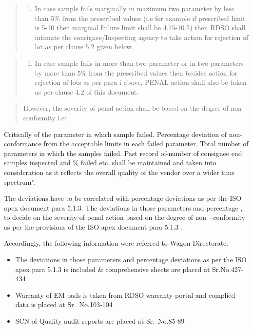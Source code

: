 \documentclass[nofonts,]{tufte-book}
\providecommand{\tightlist}{%
  \setlength{\itemsep}{0pt}\setlength{\parskip}{0pt}}
\begin{document}
\begin{quote}
\begin{enumerate}
\def\labelenumi{(\roman{enumi})}
\tightlist
\item
  In case sample fails marginally in maximum two parameter by less than
  5\% from the prescribed values (i.e for example if prescribed limit is
  5-10 then marginal failure limit shall be 4.75-10.5) then RDSO shall
  intimate the consignee/Inspecting agency to take action for rejection
  of lot as per clause 5.2 given below.
\end{enumerate}
\end{quote}

\begin{quote}
\begin{enumerate}
\def\labelenumi{(\roman{enumi})}
\setcounter{enumi}{1}
\tightlist
\item
  In case sample fails in more than two parameter or in two parameters
  by more than 5\% from the prescribed values then besides action for
  rejection of lots as per para i above, PENAL action shall also be
  taken as per clause 4.2 of this document.
\end{enumerate}
\end{quote}

\begin{quote}
However, the severity of penal action shall be based on the degree of
non-conformity i.e:
\end{quote}

Critically of the parameter in which sample failed. Percentage deviation
of non-conformance from the acceptable limits in each failed parameter.
Total number of parameters in which the samples failed. Past record
of-number of consignee end samples inspected and \% failed etc. shall be
maintained and taken into consideration as it reflects the overall
quality of the vendor over a wider time spectrum''.

The deviations have to be correlated with percentage deviations as per
the ISO apex document para 5.1.3. The deviations in those parameters and
percentage , to decide on the severity of penal action based on the
degree of non - conformity as per the provisions of the ISO apex
document para 5.1.3 .

Accordingly, the following information were referred to Wagon
Directorate.

\begin{itemize}
\item
  The deviations in those parameters and percentage deviations as per
  the ISO apex para 5.1.3 is included \& comprehensive sheets are placed
  at Sr.No.427-434 .
\item
  Warranty of EM pads is taken from RDSO warranty portal and complied
  data is placed at Sr.~No.103-104
\item
  SCN of Quality audit reports are placed at Sr.~No.85-89
\end{itemize}
\end{document}
